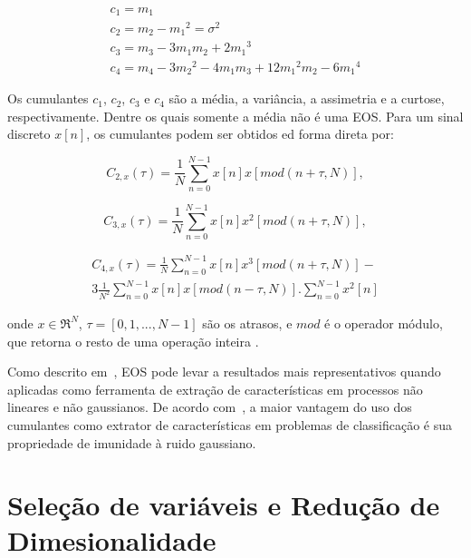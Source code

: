 \begin{equation}
\begin{matrix}
c_1 = m_1\\ 
c_2 = m_2-{m_1}^2=\sigma^2\\ 
c_3 = m_3-3{m_1}{m_2}+2{m_1}^3\\ 
c_4 = m_4 - 3{m_2}^2-4m_1m_3+12{m_1}^2m_2-6{m_1}^4
\end{matrix}
\end{equation}

Os cumulantes $c_1$, $c_2$, $c_3$ e $c_4$ são a média, a variância, a assimetria e a curtose, respectivamente. Dentre os quais somente a média não é uma EOS. Para um sinal discreto $x[n]$, os cumulantes podem ser obtidos ed forma direta por:

\begin{equation}
    C_{2,x}(\tau) = \frac{1}{N}\sum_{n=0}^{N-1}x[n]x[mod(n+\tau,N)],
    \label{eq:Dcum2}
\end{equation}

\begin{equation}
    C_{3,x}(\tau) = \frac{1}{N}\sum_{n=0}^{N-1}x[n]x^2[mod(n+\tau,N)],
    \label{eq:Dcum3}
\end{equation}

\begin{equation} \label{eq:cum4}
\begin{split}
    C_{4,x}(\tau) = \frac{1}{N}\sum_{n=0}^{N-1}x[n]x^3[mod(n+\tau,N)]-\\
    3\frac{1}{N^2}\sum_{n=0}^{N-1}x[n]x[mod(n-\tau,N)].\sum_{n=0}^{N-1}x^2[n]
\end{split}
\end{equation}

\noindent onde $x \in \Re^N$, $\tau=[0, 1,...,N-1]$ são os atrasos, e $mod$ é o operador módulo, que retorna o resto de uma operação inteira \cite{moreirahos}.

Como descrito em~, EOS pode levar a resultados mais representativos quando aplicadas como ferramenta de extração de características em processos não lineares e não gaussianos. De acordo com~, a maior vantagem do uso dos cumulantes como extrator de características em problemas de classificação é sua propriedade de imunidade à ruido gaussiano.


\section{Seleção de variáveis e Redução de Dimesionalidade}

